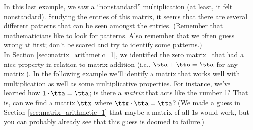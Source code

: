 In this last example, we saw a ``nonstandard'' multiplication (at least, it felt nonstandard). Studying the entries of this matrix, it seems that there are several different patterns that can be seen amongst the entries. (Remember that mathematicians like to look for patterns. Also remember that we often guess wrong at first; don't be scared and try to identify some patterns.)\\

In Section \ref{sec:matrix_arithmetic_1}, we identified the zero matrix \tto\ that had a nice property in relation to matrix addition (i.e., $\tta+\tto = \tta$ for any matrix \tta). In the following example we'll identify a matrix that works well with multiplication as well as some multiplicative properties. For instance, we've learned how $1\cdot\tta = \tta$; is there a \textit{matrix} that acts like the number 1? That is, can we find a matrix $\ttx$ where $\ttx\cdot\tta=\tta$? (We made a guess in Section \ref{sec:matrix_arithmetic_1} that maybe a matrix of all 1s would work, but you can probably already see that this guess is doomed to failure.)

\medskip

